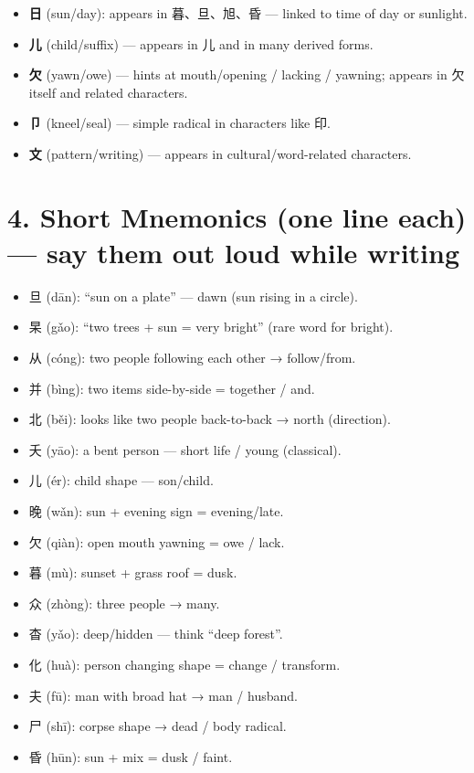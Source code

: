 \begin{CJK}{UTF8}{gbsn}
\begin{itemize}
  \item \textbf{日} (sun/day): appears in 暮、旦、旭、昏 — linked to time of day or sunlight.
  \item \textbf{儿} (child/suffix) — appears in 儿 and in many derived forms.
  \item \textbf{欠} (yawn/owe) — hints at mouth/opening / lacking / yawning; appears in 欠 itself and related characters.
  \item \textbf{卩} (kneel/seal) — simple radical in characters like 印.
  \item \textbf{文} (pattern/writing) — appears in cultural/word-related characters.
\end{itemize}

\section*{4. Short Mnemonics (one line each) — say them out loud while writing}
\begin{itemize}[leftmargin=*]
  \item 旦 (dān): ``sun on a plate'' — dawn (sun rising in a circle).  
  \item 杲 (gǎo): ``two trees + sun = very bright'' (rare word for bright).
  \item 从 (cóng): two people following each other → follow/from.
  \item 并 (bìng): two items side-by-side = together / and.
  \item 北 (běi): looks like two people back-to-back → north (direction).
  \item 夭 (yāo): a bent person — short life / young (classical).
  \item 儿 (ér): child shape — son/child.
  \item 晚 (wǎn): sun + evening sign = evening/late.
  \item 欠 (qiàn): open mouth yawning = owe / lack.
  \item 暮 (mù): sunset + grass roof = dusk.
  \item 众 (zhòng): three people → many.
  \item 杳 (yǎo): deep/hidden — think ``deep forest''.
  \item 化 (huà): person changing shape = change / transform.
  \item 夫 (fū): man with broad hat → man / husband.
  \item 尸 (shī): corpse shape → dead / body radical.
  \item 昏 (hūn): sun + mix = dusk / faint.

\end{itemize}
\end{CJK}
